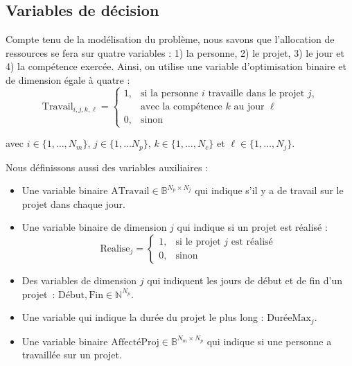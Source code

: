 \documentclass[12pt, a4paper, english, version=last, parskip=half, titlepage]{scrartcl}
\begin{document}
\subsection{Variables de décision}

Compte tenu de la modélisation du problème, nous savons que l'allocation de ressources se fera sur quatre variables : 1) la personne, 2) le projet, 3) le jour et 4) la compétence exercée. Ainsi, on utilise une variable d'optimisation binaire et de dimension égale à quatre :
\begin{equation*}
    \text{Travail}_{i,j,k,\ell} = 
    \begin{cases}
        1, & \text{si la personne $i$ travaille dans le projet $j$,} \\[-0.1em]
           & \text{avec la compétence $k$ au jour $\ell$} \\[0.2em]
        0, & \text{sinon}
    \end{cases}
\end{equation*}

avec $i \in \{1, \dots, N_m\}$, $j \in \{1, \dots N_p\}$, $k \in \{1, \dots, N_c\}$ et $\ell \in \{1, \dots, N_j\}$.

Nous définissons aussi des variables auxiliaires :

\begin{itemize}
    \item Une variable binaire $\text{ATravail} \in \mathbb{B}^{N_p \times N_j}$ qui indique s'il y a de travail sur le projet dans chaque jour.
    \item Une variable binaire de dimension $j$ qui indique si un projet est réalisé :
        \begin{equation*}
            \text{Realise}_{j} = 
            \begin{cases}
                1, & \text{si le projet $j$ est réalisé} \\
                0, & \text{sinon}
            \end{cases}
        \end{equation*}
    \item Des variables de dimension $j$ qui indiquent les jours de début et de fin d'un projet~: $\text{Début},\text{Fin} \in \mathbb{N}^{N_p}$.
    \item Une variable qui indique la durée du projet le plus long : $\text{DuréeMax}_{j}$.
    \item Une variable binaire $\text{AffectéProj} \in \mathbb{B}^{N_m \times N_p}$ qui indique si une personne a travaillée sur un projet.
\end{itemize}
\end{document}
